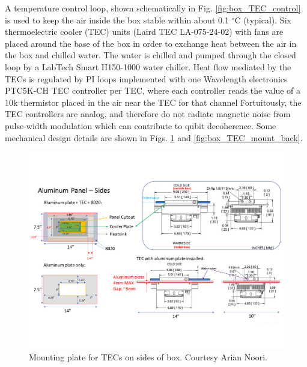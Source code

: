 A temperature control loop, shown schematically in Fig. \ref{fig:box_TEC_control} is used to keep the air inside the box stable within about 0.1 $^{\circ}$C (typical). Six thermoelectric cooler (TEC) units (Laird TEC LA-075-24-02) with fans are placed around the base of the box in order to exchange heat between the air in the box and chilled water. The water is chilled and pumped through the closed loop by a LabTech Smart H150-1000 water chiller. Heat flow mediated by the TECs is regulated by PI loops implemented with one Wavelength electronics PTC5K-CH TEC controller per TEC, where each controller reads the value of a 10k thermistor placed in the air near the TEC for that channel Fortuitously, the TEC controllers are analog, and therefore do not radiate magnetic noise from pulse-width modulation which can contribute to qubit decoherence. Some mechanical design details are shown in Figs. \ref{fig:box_TEC_mount_side} and \ref{fig:box_TEC_mount_back}.

\newpage

\begin{figure}
    \centering
    \includegraphics[width=1\textwidth]{Images/network_box_TEC_mount_sides.pdf}
    \caption{Mounting plate for TECs on sides of box. Courtesy Arian Noori.}
    \label{fig:box_TEC_mount_side}
\end{figure}

\newpage

